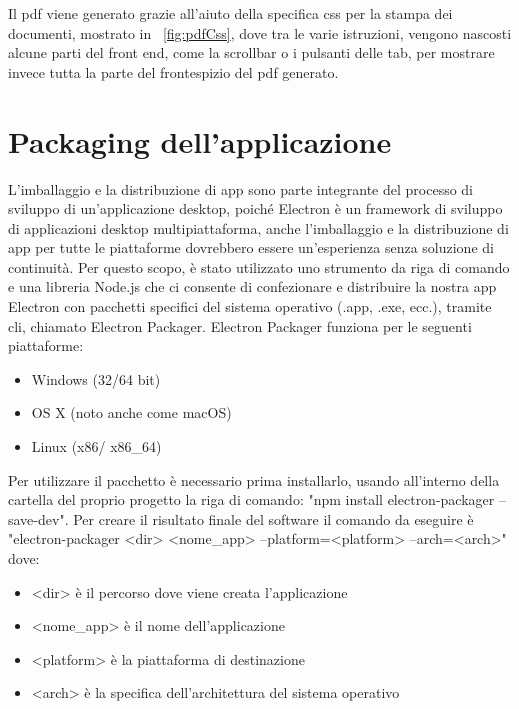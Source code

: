 Il pdf viene generato grazie all'aiuto della specifica \Gls{css} per la stampa dei documenti, mostrato in ~\ref{fig:pdfCss}, dove tra le varie istruzioni, vengono nascosti alcune parti del front end, come la scrollbar o i pulsanti delle tab, per mostrare invece tutta la parte del frontespizio del pdf generato.



\newpage

\section{Packaging dell'applicazione}

L'imballaggio e la distribuzione di app sono parte integrante del processo di sviluppo di un'applicazione desktop, poiché Electron è un framework di sviluppo di applicazioni desktop multipiattaforma, anche l'imballaggio e la distribuzione di app per tutte le piattaforme dovrebbero essere un'esperienza senza soluzione di continuità.
Per questo scopo, è stato utilizzato uno strumento da riga di comando e una libreria Node.js che ci consente di confezionare e distribuire la nostra app Electron con pacchetti specifici del sistema operativo (.app, .exe, ecc.), tramite \Gls{cli}, chiamato Electron Packager. Electron Packager funziona per le seguenti piattaforme:
\begin{itemize}
	\item Windows (32/64 bit)
	\item OS X (noto anche come macOS)
	\item Linux (x86/ x86_64)
\end{itemize}


Per utilizzare il pacchetto è necessario prima installarlo, usando all'interno della cartella del proprio progetto la riga di comando: "npm install electron-packager --save-dev".
Per creare il risultato finale del software il comando da eseguire è "electron-packager <dir> <nome_app> --platform=<platform> --arch=<arch>" dove:
\begin{itemize}
	\item <dir> è il percorso dove viene creata l'applicazione
	\item <nome_app> è il nome dell'applicazione
	\item <platform> è la piattaforma di destinazione
	\item <arch> è la specifica dell'architettura del sistema operativo
\end{itemize}




